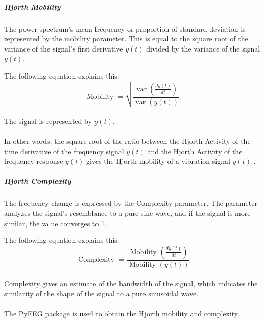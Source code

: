 \documentclass[10pt,twocolumn,letterpaper]{article}
\begin{document}
\subparagraph{Hjorth Mobility}
The power spectrum's mean frequency or proportion of standard deviation is represented by the mobility parameter. This is equal to the square root of the variance of the signal's first derivative $y(t)$ divided by the variance of the signal $y(t)$. 

The following equation explains this:\hfill \break \hfill \break \begin{equation}
\text { Mobility }=\sqrt{\frac{\operatorname{var}\left(\frac{d y(t)}{d t}\right)}{\operatorname{var}(y(t))}} .
\end{equation}
\paragraph{}The signal is represented by $y(t)$.
\paragraph{}In other words, the square root of the ratio between the Hjorth Activity of the time derivative of the frequency signal $y(t)$ and the Hjorth Activity of the frequency response $y(t)$ gives the Hjorth mobility of a vibration signal $y(t)$ \cite{HjorthMob}. 

\subparagraph{Hjorth Complexity}
The frequency change is expressed by the Complexity parameter. The parameter analyzes the signal's resemblance to a pure sine wave, and if the signal is more similar, the value converges to $1$. 

The following equation explains this:
\begin{equation}
\text { Complexity }=\frac{\text { Mobility }\left(\frac{d y(t)}{d t}\right)}{\text { Mobility }(y(t))}
\end{equation}

\paragraph{}Complexity gives an estimate of the bandwidth of the signal, which indicates the similarity of the shape of the signal to a pure sinusoidal wave\cite{HjorthMob}.

\paragraph{}The PyEEG\cite{pyeeg} package is used to obtain the Hjorth mobility and complexity.
\end{document}
